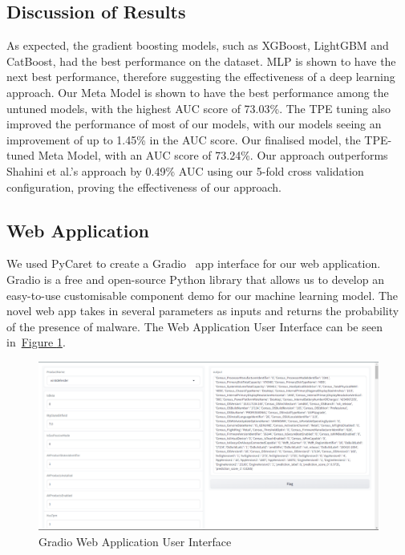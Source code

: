 \documentclass[pdflatex,sn-basic,Numbered]{sn-jnl}%
\theoremstyle{thmstyleone}%
\theoremstyle{thmstyletwo}%
\theoremstyle{thmstylethree}%
\newcommand{\reffig}[1]{\hyperref[#1]{Figure \ref*{#1}}}
\begin{document}
\subsection{Discussion of Results}\label{subsec:discussion-of-results}
As expected, the gradient boosting models, such as XGBoost, LightGBM and CatBoost, had the best performance on the dataset.
MLP is shown to have the next best performance, therefore suggesting the effectiveness of a deep learning approach.
Our Meta Model is shown to have the best performance among the untuned models, with the highest AUC score of 73.03\%.
The TPE tuning also improved the performance of most of our models, with our models seeing an improvement of up to 1.45\% in the AUC score.
Our finalised model, the TPE-tuned Meta Model, with an AUC score of 73.24\%. Our approach outperforms Shahini et al.\cite{shahini2019}'s approach by 0.49\% AUC using our 5-fold cross validation configuration, proving the effectiveness of our approach. 

\subsection{Web Application}\label{subsec:web-application}
We used PyCaret to create a Gradio~\cite{gradio} app interface for our web application.
Gradio is a free and open-source Python library that allows us to develop an easy-to-use customisable component demo for our machine learning model.
The novel web app takes in several parameters as inputs and returns the probability of the presence of malware.
The Web Application User Interface can be seen in~\reffig{fig:webapp}.

\begin{figure}[hb]
    \centering
    \includegraphics[width=\linewidth]{images/webapp}
    \caption{Gradio Web Application User Interface}
    \label{fig:webapp}
\end{figure}
\end{document}
